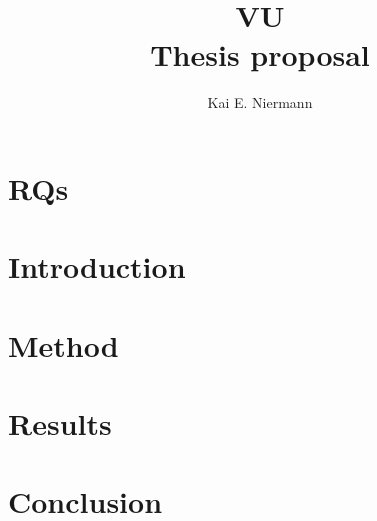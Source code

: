 \documentclass[12pt,a4paper,oneside]{article}
\title{
    \Huge{VU} \\ \LARGE 
    Thesis proposal
}
\author{
Kai E. Niermann 
}
\date{\DTMusedate{date}}
\begin{document}
\maketitle

% 

\begin{abstract}
\end{abstract}

\section{RQs}

\section{Introduction}

\section{Method}

\section{Results}

\section{Conclusion}
\end{document}
